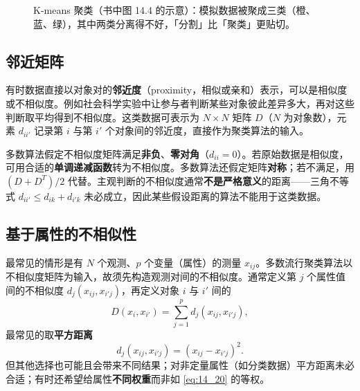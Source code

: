 \begin{figure}[htbp]
\centering
{}
\caption{K-means 聚类（书中图 14.4 的示意）：模拟数据被聚成三类（橙、蓝、绿），其中两类分离得不好，「分割」比「聚类」更贴切。}
\label{fig:14_4}
\end{figure}

\subsection{邻近矩阵}

有时数据直接以对象对的\textbf{邻近度}（proximity，相似或亲和）表示，可以是相似度或不相似度。例如社会科学实验中让参与者判断某些对象彼此差异多大，再对这些判断取平均得到不相似度。这类数据可表示为 $N\times N$ 矩阵 $D$（$N$ 为对象数），元素 $d_{ii'}$ 记录第 $i$ 与第 $i'$ 个对象间的邻近度，直接作为聚类算法的输入。

多数算法假定不相似度矩阵满足\textbf{非负}、\textbf{零对角}（$d_{ii}=0$）。若原始数据是相似度，可用合适的\textbf{单调递减函数}转为不相似度。多数算法还假定矩阵\textbf{对称}；若不满足，用 $(D+D^T)/2$ 代替。主观判断的不相似度通常\textbf{不是严格意义}的距离——三角不等式 $d_{ii'}\le d_{ik}+d_{i'k}$ 未必成立，因此某些假设距离的算法不能用于这类数据。

\subsection{基于属性的不相似性}

最常见的情形是有 $N$ 个观测、$p$ 个变量（属性）的测量 $x_{ij}$。多数流行聚类算法以不相似度矩阵为输入，故须先构造观测对间的不相似度。通常定义第 $j$ 个属性值间的不相似度 $d_j(x_{ij},x_{i'j})$，再定义对象 $i$ 与 $i'$ 间的
\begin{equation}
D(x_i,x_{i'}) = \sum_{j=1}^{p} d_j(x_{ij},x_{i'j}), \label{eq:14_20}
\end{equation}
最常见的取\textbf{平方距离}
\begin{equation}
d_j(x_{ij},x_{i'j}) = (x_{ij}-x_{i'j})^2. \label{eq:14_21}
\end{equation}
但其他选择也可能且会带来不同结果；对非定量属性（如分类数据）平方距离未必合适；有时还希望给属性\textbf{不同权重}而非如 \eqref{eq:14_20} 的等权。

